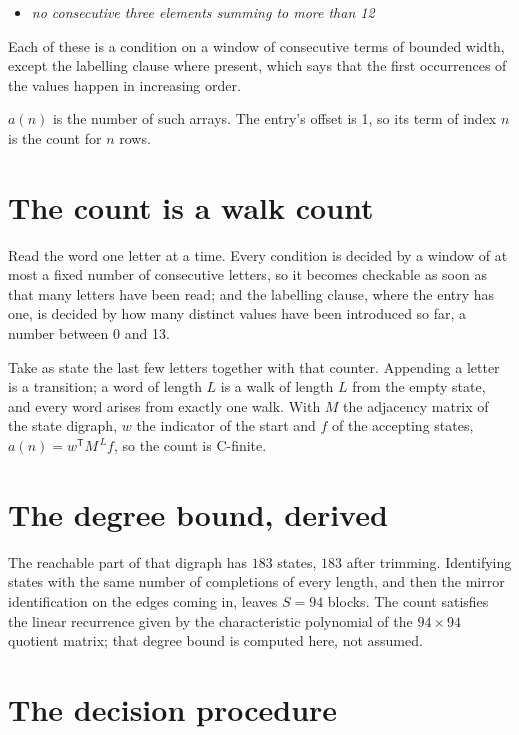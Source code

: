 \documentclass[11pt]{article}
\theoremstyle{definition}
\begin{document}
\begin{itemize}

\item {\itshape no consecutive three elements summing to more than 12}

\end{itemize}

Each of these is a condition on a window of consecutive terms of bounded width, except the labelling clause where present, which says that the first occurrences of the values happen in increasing order.

$a(n)$ is the number of such arrays. The entry's offset is 1, so its term of index $n$ is the count for $n$ rows.

\section{The count is a walk count}

Read the word one letter at a time. Every condition is decided by a window of at most a fixed number of consecutive letters, so it becomes checkable as soon as that many letters have been read; and the labelling clause, where the entry has one, is decided by how many distinct values have been introduced so far, a number between $0$ and 13.

Take as state the last few letters together with that counter. Appending a letter is a transition; a word of length $L$ is a walk of length $L$ from the empty state, and every word arises from exactly one walk. With $M$ the adjacency matrix of the state digraph, $w$ the indicator of the start and $f$ of the accepting states, $a(n) = w^{\mathsf T}M^{\,L}f$, so the count is C-finite.

\section{The degree bound, derived}

The reachable part of that digraph has $183$ states, $183$ after trimming. Identifying states with the same number of completions of every length, and then the mirror identification on the edges coming in, leaves $S = 94$ blocks. The count satisfies the linear recurrence given by the characteristic polynomial of the $94\times94$ quotient matrix; that degree bound is computed here, not assumed.

\section{The decision procedure}
\end{document}
